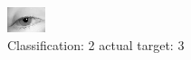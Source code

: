 \begin{figure}[h!]
\begin{center}
\includegraphics[width=0.60\columnwidth]{figures/ID2869_class_2_target_3.png}
\end{center}
\caption{ Classification: 2 actual target: 3}
\label{fig:ID2869_class_2_target_3}
\end{figure}
